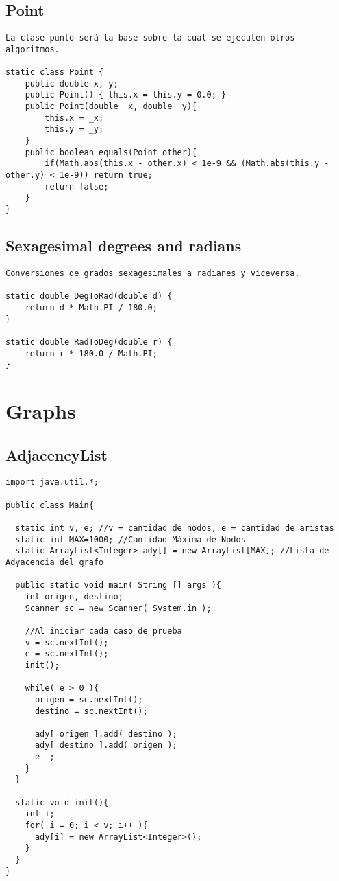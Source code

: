 \documentclass[10pt,letterpaper,twocolumn,twosided]{article}
\begin{document}
\subsection{Point}
\begin{lstlisting}
La clase punto será la base sobre la cual se ejecuten otros algoritmos. 

static class Point { 
	public double x, y;
  	public Point() { this.x = this.y = 0.0; }
  	public Point(double _x, double _y){
  		this.x = _x;
  		this.y = _y;
  	} 
  	public boolean equals(Point other){
  		if(Math.abs(this.x - other.x) < 1e-9 && (Math.abs(this.y - other.y) < 1e-9)) return true;
  		return false;
  	}
}
\end{lstlisting}

\subsection{Sexagesimal degrees and radians}
\begin{lstlisting}
Conversiones de grados sexagesimales a radianes y viceversa.

static double DegToRad(double d) { 
	return d * Math.PI / 180.0; 
}

static double RadToDeg(double r) { 
	return r * 180.0 / Math.PI;
}
\end{lstlisting}

\section{Graphs}

\subsection{AdjacencyList}
\begin{lstlisting}
import java.util.*;

public class Main{
  
  static int v, e; //v = cantidad de nodos, e = cantidad de aristas
  static int MAX=1000; //Cantidad Máxima de Nodos
  static ArrayList<Integer> ady[] = new ArrayList[MAX]; //Lista de Adyacencia del grafo
  
  public static void main( String [] args ){
    int origen, destino;
    Scanner sc = new Scanner( System.in );
    
    //Al iniciar cada caso de prueba
    v = sc.nextInt();
    e = sc.nextInt();
    init();
    
    while( e > 0 ){
      origen = sc.nextInt();
      destino = sc.nextInt();
      
      ady[ origen ].add( destino );
      ady[ destino ].add( origen );
      e--;
    }
  }
  
  static void init(){
    int i;
    for( i = 0; i < v; i++ ){
      ady[i] = new ArrayList<Integer>();
    }
  }
}
\end{lstlisting}
\end{document}
